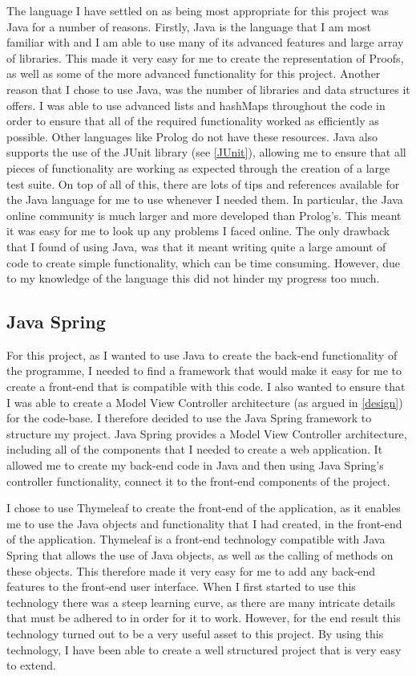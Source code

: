 The language I have settled on as being most appropriate for this project was Java for a number of reasons. Firstly, Java is the language that I am most familiar with and I am able to use many of its advanced features and large array of libraries. This made it very easy for me to create the representation of Proofs, as well as some of the more advanced functionality for this project. Another reason that I chose to use Java, was the number of libraries and data structures it offers. I was able to use advanced lists and hashMaps throughout the code in order to ensure that all of the required functionality worked as efficiently as possible. Other languages like Prolog do not have these resources. Java also supports the use of the JUnit library (see \ref{JUnit}), allowing me to ensure that all pieces of functionality are working as expected through the creation of a large test suite. On top of all of this, there are lots of tips and references available for the Java language for me to use whenever I needed them. In particular, the Java online community is much larger and more developed than Prolog's. This meant it was easy for me to look up any problems I faced online. The only drawback that I found of using Java, was that it meant writing quite a large amount of code to create simple functionality, which can be time consuming. However, due to my knowledge of the language this did not hinder my progress too much. 


\subsection{Java Spring \label{JavaSpring}}

For this project, as I wanted to use Java to create the back-end functionality of the programme, I needed to find a framework that would make it easy for me to create a front-end that is compatible with this code. I also wanted to ensure that I was able to create a Model View Controller architecture (as argued in \ref{design}) for the code-base. I therefore decided to use the Java Spring framework to structure my project. Java Spring provides a Model View Controller architecture, including all of the components that I needed to create a web application. It allowed me to create my back-end code in Java and then using Java Spring's controller functionality, connect it to the front-end components of the project. 

I chose to use Thymeleaf to create the front-end of the application, as it enables me to use the Java objects and functionality that I had created, in the front-end of the application. Thymeleaf is a front-end technology compatible with Java Spring that allows the use of Java objects, as well as the calling of methods on these objects. This therefore made it very easy for me to add any back-end features to the front-end user interface. When I first started to use this technology there was a steep learning curve, as there are many intricate details that must be adhered to in order for it to work. However, for the end result this technology turned out to be a very useful asset to this project. By using this technology, I have been able to create a well structured project that is very easy to extend.

